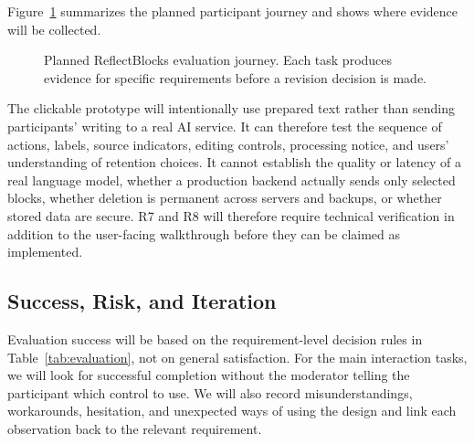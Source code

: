 \documentclass[sigconf,nonacm]{acmart}
\begin{document}
Figure~\ref{fig:evaluationjourney} summarizes the planned participant journey
and shows where evidence will be collected.

\begin{figure}[tb]
\centering
{}
\caption{Planned ReflectBlocks evaluation journey. Each task produces evidence
for specific requirements before a revision decision is made.}
\label{fig:evaluationjourney}
\end{figure}

The clickable prototype will intentionally use prepared text rather than sending
participants' writing to a real AI service. It can therefore test the sequence
of actions, labels, source indicators, editing controls, processing notice, and
users' understanding of retention choices. It cannot establish the quality or
latency of a real language model, whether a production backend actually sends
only selected blocks, whether deletion is permanent across servers and backups,
or whether stored data are secure. R7 and R8 will therefore require technical
verification in addition to the user-facing walkthrough before they can be
claimed as implemented.

\subsection{Success, Risk, and Iteration}

Evaluation success will be based on the requirement-level decision rules in
Table~\ref{tab:evaluation}, not on general satisfaction. For the main interaction
tasks, we will look for successful completion without the moderator telling the
participant which control to use. We will also record misunderstandings,
workarounds, hesitation, and unexpected ways of using the design and link each
observation back to the relevant requirement.
\end{document}
